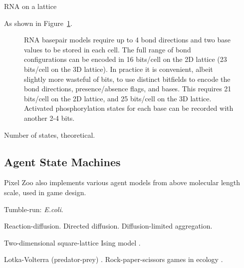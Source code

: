\documentclass{acm_proc_article-sp}
\begin{document}
RNA on a lattice \cite{LeoniVanderzande2003,JostEveraers2010,ZaraPretti2007,GillespieMayneJiang2009}


As shown in Figure~\ref{fig:rna}.

\begin{figure}
\caption{
\label{fig:rna}
RNA basepair models require up to 4 bond directions and two base values to be stored in each cell.
The full range of bond configurations can be encoded in 16 bits/cell on the 2D lattice (23 bits/cell on the 3D lattice).
In practice it is convenient, albeit slightly more wasteful of bits,
to use distinct bitfields to encode the bond directions, presence/absence flags, and bases.
This requires 21 bits/cell on the 2D lattice, and 25 bits/cell on the 3D lattice.
Activated phosphorylation states for each base can be recorded with another 2-4 bits.
}
\end{figure}

Number of states, theoretical.


\subsection{Agent State Machines}

Pixel Zoo also implements various agent models from above molecular length scale, used in game design.

Tumble-run: {\em E.coli}.
\cite{RosserEtAl2013}


Reaction-diffusion.
Directed diffusion.
Diffusion-limited aggregation.
\cite{DLA}

Two-dimensional square-lattice Ising model \cite{Onsager1944}.

Lotka-Volterra (predator-prey) \cite{Lotka1910,Hirota199739}.
Rock-paper-scissors games in ecology \cite{Tainaka2000}.
\end{document}

